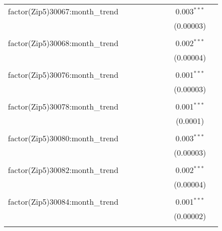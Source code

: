 \begin{table}[H]
{\begin{tabular}{@{\extracolsep{5pt}}lcccccccc}
  factor(Zip5)30067:month\_trend &  &  &  &  &  &  & 0.003$^{***}$ &  \\  

   &  &  &  &  &  &  & (0.00003) &  \\  

   & & & & & & & & \\  

  factor(Zip5)30068:month\_trend &  &  &  &  &  &  & 0.002$^{***}$ &  \\  

   &  &  &  &  &  &  & (0.00004) &  \\  

   & & & & & & & & \\  

  factor(Zip5)30076:month\_trend &  &  &  &  &  &  & 0.001$^{***}$ &  \\  

   &  &  &  &  &  &  & (0.00003) &  \\  

   & & & & & & & & \\  

  factor(Zip5)30078:month\_trend &  &  &  &  &  &  & 0.001$^{***}$ &  \\  

   &  &  &  &  &  &  & (0.0001) &  \\  

   & & & & & & & & \\  

  factor(Zip5)30080:month\_trend &  &  &  &  &  &  & 0.003$^{***}$ &  \\  

   &  &  &  &  &  &  & (0.00003) &  \\  

   & & & & & & & & \\  

  factor(Zip5)30082:month\_trend &  &  &  &  &  &  & 0.002$^{***}$ &  \\  

   &  &  &  &  &  &  & (0.00004) &  \\  

   & & & & & & & & \\  

  factor(Zip5)30084:month\_trend &  &  &  &  &  &  & 0.001$^{***}$ &  \\  

   &  &  &  &  &  &  & (0.00002) &  \\  

   & & & & & & & & \\  


\end{tabular}}
\end{table}
